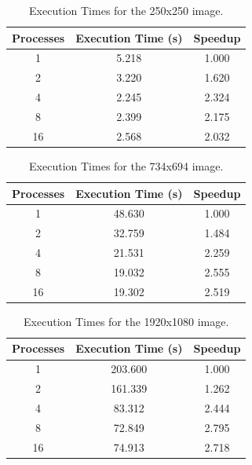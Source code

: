 \documentclass[10pt,twocolumn,letterpaper]{article}
\begin{document}
\begin{table}[H]
	\begin{center}
		\begin{tabular}{|c|c|c|}
			\hline
			Processes & Execution Time (s) & Speedup \\
			\hline
			1 & 5.218 & 1.000 \\
			2 & 3.220 & 1.620 \\
			4 & 2.245 & 2.324 \\
			8 & 2.399 & 2.175 \\
			16 & 2.568 & 2.032 \\
			\hline
		\end{tabular}
	\end{center}
	\caption{Execution Times for the 250x250 image.}
	\label{tab:speedup_k_i_1}
\end{table}

\begin{table}[H]
	\begin{center}
		\begin{tabular}{|c|c|c|}
			\hline
			Processes & Execution Time (s) & Speedup \\
			\hline
			1 & 48.630 & 1.000 \\
			2 & 32.759 & 1.484 \\
			4 & 21.531 & 2.259 \\
			8 & 19.032 & 2.555 \\
			16 & 19.302 & 2.519 \\
			\hline
		\end{tabular}
	\end{center}
	\caption{Execution Times for the 734x694 image.}
	\label{tab:speedup_k_i_2}
\end{table}

\begin{table}[H]
	\begin{center}
		\begin{tabular}{|c|c|c|}
			\hline
			Processes & Execution Time (s) & Speedup \\
			\hline
			1 & 203.600 & 1.000 \\
			2 & 161.339 & 1.262 \\
			4 & 83.312 & 2.444 \\
			8 & 72.849 & 2.795 \\
			16 & 74.913 & 2.718 \\
			\hline
		\end{tabular}
	\end{center}
	\caption{Execution Times for the 1920x1080 image.}
	\label{tab:speedup_i_3}
\end{table}
\end{document}
